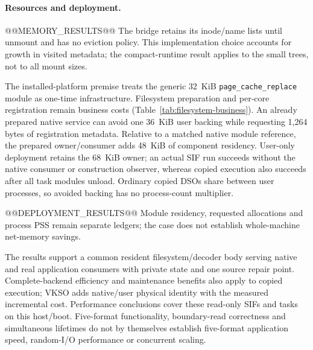 \paragraph{Resources and deployment.}
@@MEMORY_RESULTS@@
The bridge retains its inode/name lists until unmount and has no eviction
policy. This implementation choice accounts for growth in visited metadata;
the compact-runtime result applies to the small trees, not to all mount sizes.

The installed-platform premise treats the generic 32~KiB
\texttt{page\_cache\_replace} module as one-time infrastructure. Filesystem
preparation and per-core registration remain business costs
(Table~\ref{tab:filesystem-business}).
An already prepared native service can avoid one 36~KiB user backing while
requesting 1,264 bytes of registration metadata. Relative to a matched native
module reference, the prepared owner/consumer adds 48~KiB of component residency. User-only
deployment retains the 68~KiB owner; an actual SIF run succeeds without the
native consumer or construction observer, whereas copied execution also
succeeds after all task modules unload. Ordinary copied DSOs share between
user processes, so avoided backing has no process-count multiplier.

@@DEPLOYMENT_RESULTS@@
Module residency, requested allocations and process PSS remain separate
ledgers; the case does not establish whole-machine net-memory savings.

The results support a common resident filesystem/decoder body serving
native and real application consumers with private state and one source
repair point. Complete-backend efficiency and maintenance benefits also
apply to copied execution; VKSO adds native/user physical identity with the
measured incremental cost. Performance conclusions cover these read-only
SIFs and tasks on this host/boot. Five-format functionality, boundary-read
correctness and simultaneous lifetimes do not by themselves establish
five-format application speed, random-I/O performance or concurrent scaling.
